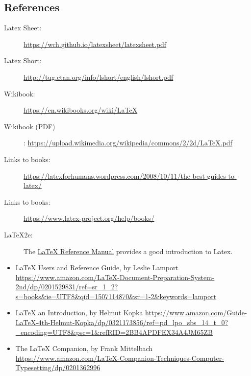 \subsection{References}

\begin{description}


\item[Latex Sheet:]    \url{https://wch.github.io/latexsheet/latexsheet.pdf}

\item[Latex Short:]    \url{http://tug.ctan.org/info/lshort/english/lshort.pdf}

\item[Wikibook:]       \url{https://en.wikibooks.org/wiki/LaTeX}
\item[Wikibook (PDF)]: \url{https://upload.wikimedia.org/wikipedia/commons/2/2d/LaTeX.pdf}

\item [Links to books:] \url{https://latexforhumans.wordpress.com/2008/10/11/the-best-guides-to-latex/}
\item [Links to books:] \url{https://www.latex-project.org/help/books/}
\item [LaTeX2e:]
  The
  \href{http://texdoc.net/texmf-dist/doc/latex/latex2e-help-texinfo/latex2e.pdf}{LaTeX
  Reference Manual} provides a good introduction to Latex.

\end{description}


\begin{itemize}

\item
  LaTeX Users and Reference Guide, by Leslie Lamport
  \url{https://www.amazon.com/LaTeX-Document-Preparation-System-2nd/dp/0201529831/ref=sr_1_2?s=books\&ie=UTF8\&qid=1507114870\&sr=1-2\&keywords=lamport}
\item
  LaTeX an Introduction, by Helmut Kopka
  \url{https://www.amazon.com/Guide-LaTeX-4th-Helmut-Kopka/dp/0321173856/ref=pd_lpo_sbs_14_t_0?_encoding=UTF8\&psc=1\&refRID=2BB4APDFEX34A4JM65ZB}
\item
  The LaTeX Companion, by Frank Mittelbach
  \url{https://www.amazon.com/LaTeX-Companion-Techniques-Computer-Typesetting/dp/0201362996}
\end{itemize}

